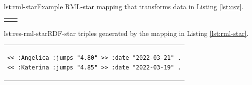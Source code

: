 \noindent\hspace{0.19\linewidth}\begin{minipage}{1\linewidth}
\begin{captionedlisting}{lst:rml-star}{Example RML-star mapping that transforms data in Listing \ref{lst:csv}.}
\centering
\begin{tabular}{cc}
\hspace{-7em}{\begin{lstlisting}[basicstyle=\ttfamily\small,label={list:example1},columns=flexible]
<#innerTM> 
  a rml:NonAssertedTriplesMap ;
  rml:logicalSource :marks ;
  rml:subjectMap [ 
    rr:template ":{PERSON}" ] ;
  rr:predicateObjectMap [ 
    rr:predicate :jumps ;
    rml:objectMap [
      rml:reference "MARK" ] ] .
\end{lstlisting}}
&
\hspace{2em}{\begin{lstlisting}[basicstyle=\ttfamily\small,label={list:example1},columns=flexible]
<#outerTM> 
  a rr:TriplesMap ;
  rml:logicalSource :marks ;
  rml:subjectMap [ 
    rml:quotedTriplesMap <#innerTM> ] ;
  rr:predicateObjectMap [ 
    rr:predicate :date ;
    rml:objectMap [
      rml:reference "DATE" ] ] .
\end{lstlisting}}
\end{tabular}
\end{captionedlisting}
\end{minipage}



\noindent\hspace{0.19\linewidth}\begin{minipage}{\linewidth}
\begin{captionedlisting}{lst:res-rml-star}{RDF-star triples generated by the mapping in Listing \ref{lst:rml-star}.}
\centering
\begin{tabular}{c}
\hspace{-1em}
{\begin{lstlisting}[basicstyle=\ttfamily\small,label={list:example1},columns=flexible]
<< :Angelica :jumps "4.80" >> :date "2022-03-21" .
<< :Katerina :jumps "4.85" >> :date "2022-03-19" .
\end{lstlisting}}
\end{tabular}
\end{captionedlisting}
\end{minipage}







